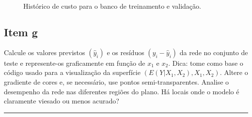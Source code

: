\documentclass[
  a4paperpaper,
]{article}
\begin{document}
\begin{figure}[H]


\caption{\label{fig-historico-custo-treinamento-validacao}Histórico de
custo para o banco de treinamento e validação.}

\end{figure}%

\subsection{Item g}\label{item-g}

Calcule os valores previstos \((\hat{y}_i)\) e os resíduos
\((y_i - \hat{y}_i)\) da rede no conjunto de teste e represente-os
graficamente em função de \(x_1\) e \(x_2\). Dica: tome como base o
código usado para a visualização da superfície
\((E(Y |X_1, X_2), X_1, X_2)\). Altere o gradiente de cores e, se
necessário, use pontos semi-transparentes. Analise o desempenho da rede
nas diferentes regiões do plano. Há locais onde o modelo é claramente
viesado ou menos acurado?

\begin{center}\rule{0.5\linewidth}{0.5pt}\end{center}
\end{document}
